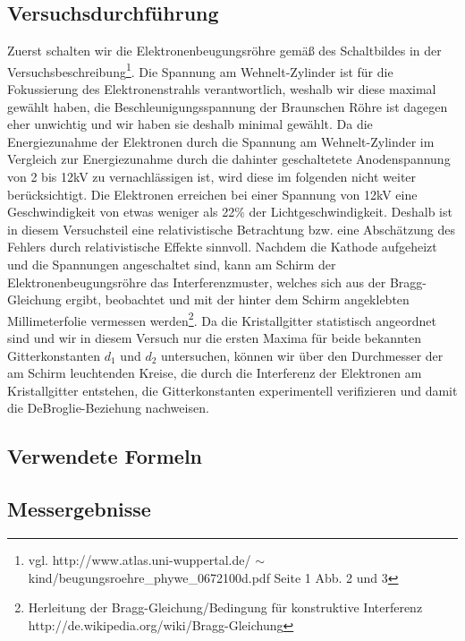 \documentclass[12pt,a4paper]{article}
\begin{document}
\subsection{Versuchsdurchführung}
Zuerst schalten wir die Elektronenbeugungsröhre gemäß des Schaltbildes in der Versuchsbeschreibung\footnote{vgl. http://www.atlas.uni-wuppertal.de/
$\sim$kind/beugungsroehre\_phywe\_0672100d.pdf Seite 1 Abb. 2 und 3}. Die Spannung am Wehnelt-Zylinder ist für die Fokussierung des Elektronenstrahls verantwortlich, weshalb wir diese maximal gewählt haben, die Beschleunigungsspannung der Braunschen Röhre ist dagegen eher unwichtig und wir haben sie deshalb minimal gewählt. Da die Energiezunahme der Elektronen durch die Spannung am Wehnelt-Zylinder im Vergleich zur Energiezunahme durch die dahinter geschaltetete Anodenspannung von 2 bis 12kV zu vernachlässigen ist, wird diese im folgenden nicht weiter berücksichtigt. Die Elektronen erreichen bei einer Spannung von 12kV eine Geschwindigkeit von etwas weniger als 22\% der Lichtgeschwindigkeit. Deshalb ist in diesem Versuchsteil eine relativistische Betrachtung bzw. eine Abschätzung des Fehlers durch relativistische Effekte sinnvoll. Nachdem die Kathode aufgeheizt und die Spannungen angeschaltet sind, kann am Schirm der Elektronenbeugungsröhre das Interferenzmuster, welches sich aus der Bragg-Gleichung ergibt, beobachtet und mit der hinter dem Schirm angeklebten Millimeterfolie vermessen werden\footnote{Herleitung der Bragg-Gleichung/Bedingung für konstruktive Interferenz http://de.wikipedia.org/wiki/Bragg-Gleichung}.
Da die Kristallgitter statistisch angeordnet sind und wir in diesem Versuch nur die ersten Maxima für beide bekannten Gitterkonstanten $d_1$ und $d_2$ untersuchen, können wir über den Durchmesser der am Schirm leuchtenden Kreise, die durch die Interferenz der Elektronen am Kristallgitter entstehen, die Gitterkonstanten experimentell verifizieren und damit die DeBroglie-Beziehung nachweisen.
\subsection{Verwendete Formeln}
\subsection{Messergebnisse}
\end{document}
